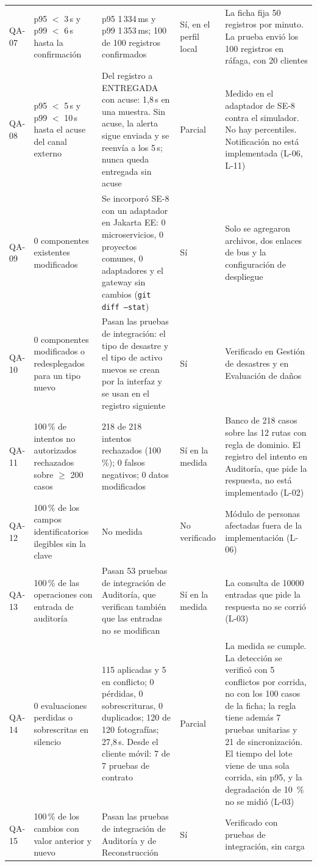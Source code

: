 \documentclass[11pt,letterpaper]{article}
\begin{document}
\begin{longtable}{L{1.2cm} L{3.4cm} L{4.2cm} L{2.0cm} L{4.2cm}}
QA-07 & p95 $<$ 3\,s y p99 $<$ 6\,s hasta la confirmación & p95 1\,334\,ms y p99
1\,353\,ms; 100 de 100 registros confirmados & Sí, en el perfil local & La ficha fija 50 registros
por minuto. La prueba envió los 100 registros en ráfaga, con 20 clientes \\
QA-08 & p95 $<$ 5\,s y p99 $<$ 10\,s hasta el acuse del canal externo & Del registro a ENTREGADA
con acuse: 1,8\,s en una muestra. Sin acuse, la alerta sigue enviada y se reenvía a los 5\,s; nunca
queda entregada sin acuse & Parcial & Medido en el adaptador de SE-8 contra el simulador. No hay
percentiles. Notificación no está implementada (L-06, L-11) \\
QA-09 & 0 componentes existentes modificados & Se incorporó SE-8 con un adaptador en Jakarta EE:
0 microservicios, 0 proyectos comunes, 0 adaptadores y el gateway sin cambios (\texttt{git diff
--stat}) & Sí & Solo se agregaron archivos, dos enlaces de bus y la configuración de despliegue \\
QA-10 & 0 componentes modificados o redesplegados para un tipo nuevo & Pasan las pruebas de
integración: el tipo de desastre y el tipo de activo nuevos se crean por la interfaz y se usan en
el registro siguiente & Sí & Verificado en Gestión de desastres y en Evaluación de daños \\
QA-11 & 100\,\% de intentos no autorizados rechazados sobre $\ge$ 200 casos & 218 de 218 intentos
rechazados (100\,\%); 0 falsos negativos; 0 datos modificados & Sí en la medida & Banco de 218 casos
sobre las 12 rutas con regla de dominio. El registro del intento en Auditoría, que pide la respuesta,
no está implementado (L-02) \\
QA-12 & 100\,\% de los campos identificatorios ilegibles sin la clave & No medida & No verificado &
Módulo de personas afectadas fuera de la implementación (L-06) \\
QA-13 & 100\,\% de las operaciones con entrada de auditoría & Pasan 53 pruebas de integración de
Auditoría, que verifican también que las entradas no se modifican & Sí en la medida & La consulta de
\num{10000} entradas que pide la respuesta no se corrió (L-03) \\
QA-14 & 0 evaluaciones perdidas o sobrescritas en silencio & 115 aplicadas y 5 en conflicto; 0
pérdidas, 0 sobrescrituras, 0 duplicados; 120 de 120 fotografías; 27,8\,s. Desde el cliente móvil: 7
de 7 pruebas de contrato & Parcial & La medida se cumple. La detección se verificó con 5 conflictos
por corrida, no con los 100 casos de la ficha; la regla tiene además 7 pruebas unitarias y 21 de
sincronización. El tiempo del lote viene de una sola corrida, sin p95, y la degradación de
\qty{10}{\percent} no se midió (L-03) \\
QA-15 & 100\,\% de los cambios con valor anterior y nuevo & Pasan las pruebas de integración de
Auditoría y de Reconstrucción & Sí & Verificado con pruebas de integración, sin carga \\
\end{longtable}
\end{document}
